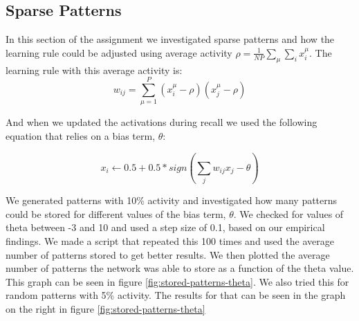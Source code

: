 \documentclass[a4paper]{article}
\begin{document}
\subsection{Sparse Patterns}
In this section of the assignment we investigated sparse patterns and how the learning rule could be adjusted using average activity $\rho=\frac{1}{NP}\sum_\mu \sum_i x_i^\mu$. The learning rule with this average activity is:
$$
w_{ij} = \sum_{\mu=1}^P (x_i^\mu - \rho)(x_j^\mu - \rho)
$$

And when we updated the activations during recall we used the following equation that relies on a bias term, $\theta$:

$$
x_i \leftarrow 0.5 + 0.5 * sign(\sum_j w_{ij}x_j - \theta)
$$

We generated patterns with 10\% activity and investigated how many patterns could be stored for different values of the bias term, $\theta$. We checked for values of theta between -3 and 10 and used a step size of 0.1, based on our empirical findings. We made a script that repeated this 100 times and used the average number of patterns stored to get better results. We then plotted the average number of patterns the network was able to store as a function of the theta value. This graph can be seen in figure \ref{fig:stored-patterns-theta}. We also tried this for random patterns with 5\% activity. The results for that can be seen in the graph on the right in figure \ref{fig:stored-patterns-theta}
\end{document}

